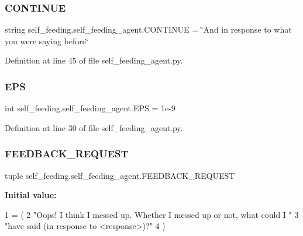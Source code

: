 \subsubsection{\texorpdfstring{C\+O\+N\+T\+I\+N\+UE}{CONTINUE}}
{\footnotesize\ttfamily string self\+\_\+feeding.\+self\+\_\+feeding\+\_\+agent.\+C\+O\+N\+T\+I\+N\+UE = \char`\"{}And in response to what you were saying before\char`\"{}}



Definition at line 45 of file self\+\_\+feeding\+\_\+agent.\+py.

\mbox{\label{namespaceself__feeding_1_1self__feeding__agent_a8d270bd7938e6c02da36eb80e6e25852}} 
\subsubsection{\texorpdfstring{E\+PS}{EPS}}
{\footnotesize\ttfamily int self\+\_\+feeding.\+self\+\_\+feeding\+\_\+agent.\+E\+PS = 1e-\/9}



Definition at line 30 of file self\+\_\+feeding\+\_\+agent.\+py.

\mbox{\label{namespaceself__feeding_1_1self__feeding__agent_aca7a649fd1c28eeeb0e5beb9735fffe6}} 
\subsubsection{\texorpdfstring{F\+E\+E\+D\+B\+A\+C\+K\+\_\+\+R\+E\+Q\+U\+E\+ST}{FEEDBACK\_REQUEST}}
{\footnotesize\ttfamily tuple self\+\_\+feeding.\+self\+\_\+feeding\+\_\+agent.\+F\+E\+E\+D\+B\+A\+C\+K\+\_\+\+R\+E\+Q\+U\+E\+ST}

{\bfseries Initial value\+:}
\begin{DoxyCode}
1 =  (
2     \textcolor{stringliteral}{"Oops! I think I messed up. Whether I messed up or not, what could I "}
3     \textcolor{stringliteral}{"have said (in response to <response>)?"}
4 )
\end{DoxyCode}


